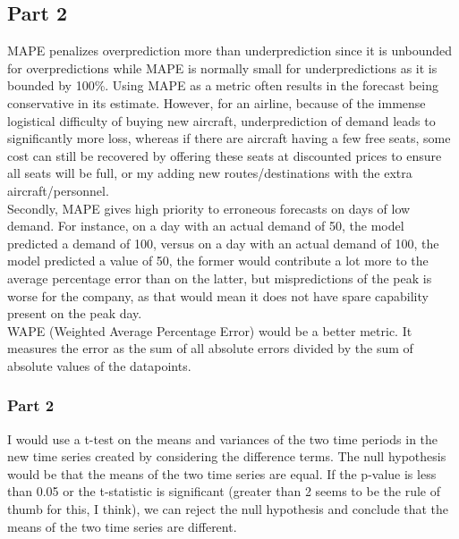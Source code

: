\documentclass{article}
\begin{document}
\subsection{Part 2}
MAPE penalizes overprediction more than underprediction since it is unbounded for overpredictions while MAPE is normally small for underpredictions as it is bounded by 100\%. Using MAPE as a metric often results in the forecast being conservative in its estimate. However,  for an airline,  because of the immense logistical difficulty of buying new aircraft,  underprediction of demand leads to significantly more loss,  whereas if there are aircraft having a few free seats,  some cost can still be recovered by offering these seats at discounted prices to ensure all seats will be full,  or my adding new routes/destinations with the extra aircraft/personnel.\\
Secondly,  MAPE gives high priority to erroneous forecasts on days of low demand. For instance,  on a day with an actual demand of 50,  the model predicted a demand of 100,  versus on a day with an actual demand of 100,  the model predicted a value of 50,  the former would contribute a lot more to the average percentage error than on the latter,  but mispredictions of the peak is worse for the company,  as that would mean it does not have spare capability present on the peak day.\\
WAPE (Weighted Average Percentage Error) would be a better metric. It measures the error as the sum of all absolute errors divided by the sum of absolute values of the datapoints.
\subsubsection{Part 2}
I would use a t-test on the means and variances of the two time periods in the new time series created by considering the difference terms. The null hypothesis would be that the means of the two time series are equal. If the p-value is less than 0.05 or the t-statistic is significant (greater than 2 seems to be the rule of thumb for this,  I think),  we can reject the null hypothesis and conclude that the means of the two time series are different.
\end{document}
